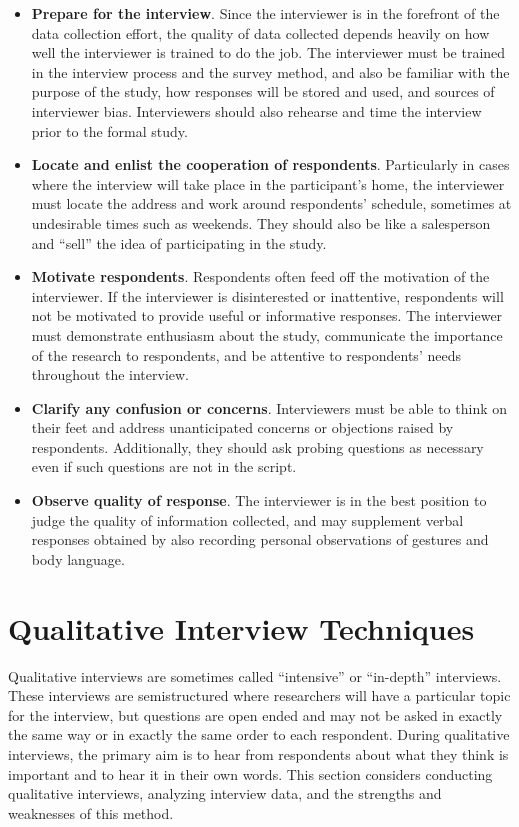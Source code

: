 \begin{itemize}
	\item \textbf{Prepare for the interview}. Since the interviewer is in the forefront of the data collection effort, the quality of data collected depends heavily on how well the interviewer is trained to do the job. The interviewer must be trained in the interview process and the survey method, and also be familiar with the purpose of the study, how responses will be stored and used, and sources of interviewer bias. Interviewers should also rehearse and time the interview prior to the formal study.
	
	\item \textbf{Locate and enlist the cooperation of respondents}. Particularly in cases where the interview will take place in the participant's home, the interviewer must locate the address and work around respondents' schedule, sometimes at undesirable times such as weekends. They should also be like a salesperson and ``sell'' the idea of participating in the study.

	\item \textbf{Motivate respondents}. Respondents often feed off the motivation of the interviewer. If the interviewer is disinterested or inattentive, respondents will not be motivated to provide useful or informative responses. The interviewer must demonstrate enthusiasm about the study, communicate the importance of the research to respondents, and be attentive to respondents' needs throughout the interview. 

	\item \textbf{Clarify any confusion or concerns}. Interviewers must be able to think on their feet and address unanticipated concerns or objections raised by respondents. Additionally, they should ask probing questions as necessary even if such questions are not in the script.

	\item \textbf{Observe quality of response}. The interviewer is in the best position to judge the quality of information collected, and may supplement verbal responses obtained by also recording personal observations of gestures and body language.
\end{itemize}

\section{Qualitative Interview Techniques}

Qualitative interviews are sometimes called ``intensive'' or ``in-depth'' interviews. These interviews are semistructured where researchers will have a particular topic for the interview, but questions are open ended and may not be asked in exactly the same way or in exactly the same order to each respondent. During qualitative interviews, the primary aim is to hear from respondents about what they think is important and to hear it in their own words. This section considers conducting qualitative interviews, analyzing interview data, and the strengths and weaknesses of this method.

